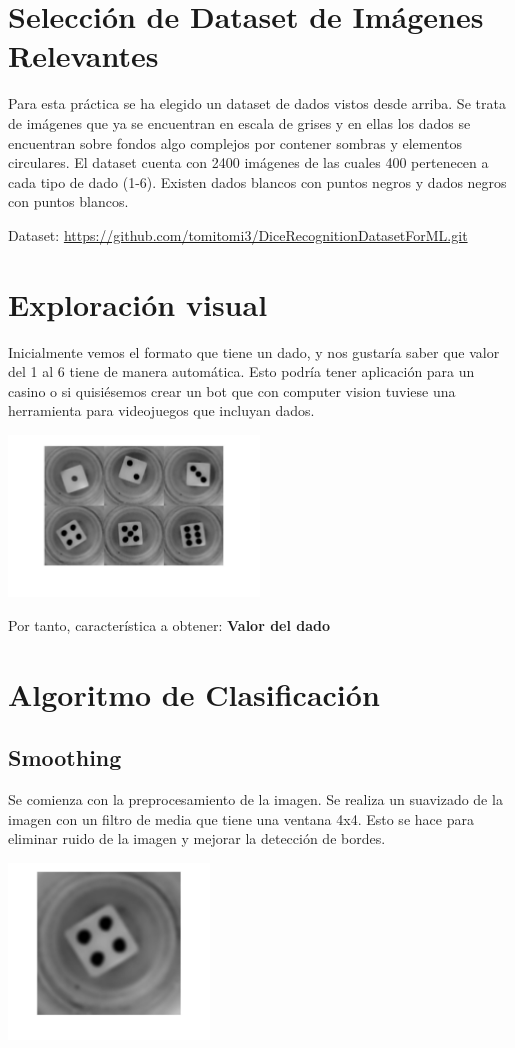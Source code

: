 \section{Selección de Dataset de Imágenes Relevantes}
Para esta práctica se ha elegido un dataset de dados vistos desde arriba. Se trata de imágenes que ya se encuentran en escala de grises y en ellas los dados se encuentran sobre fondos algo complejos por contener sombras y elementos circulares. El dataset cuenta con 2400 imágenes de las cuales 400 pertenecen a cada tipo de dado (1-6). Existen dados blancos con puntos negros y dados negros con puntos blancos.

Dataset: \url{https://github.com/tomitomi3/DiceRecognitionDatasetForML.git}

\section{Exploración visual}
Inicialmente vemos el formato que tiene un dado, y nos gustaría saber que valor del 1 al 6 tiene de manera
automática. Esto podría tener aplicación para un casino o si quisiésemos crear un bot que con computer vision tuviese una herramienta para videojuegos que incluyan dados.
\begin{center}
    \includegraphics[width=0.5\textwidth]{ImagenesLatex/dataset.jpg}
\end{center}

Por tanto, característica a obtener: \textbf{Valor del dado}

\section{Algoritmo de Clasificación}
\subsection{Smoothing}
Se comienza con la preprocesamiento de la imagen. Se realiza un suavizado de la imagen con un filtro de media que tiene una ventana 4x4. Esto se hace para eliminar ruido de la imagen y mejorar la detección de bordes.
\begin{center}
    \includegraphics[width=0.4\textwidth]{ImagenesLatex/dice_smooth.jpg}
\end{center}

